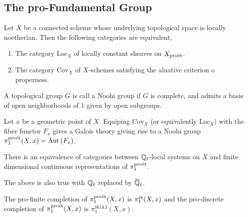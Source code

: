 \documentclass[12pt]{article}
\begin{document}
\subsection{The pro-\etale Fundamental Group}

\newcommand{\Loc}{\mathrm{Loc}}
\newcommand{\Cov}{\mathrm{Cov}}

\begin{theorem}
Let $X$ be a connected scheme whose underlying topological space is locally noetherian. Then the following categories are equivalent,
\begin{enumerate}
\item The category $\Loc_X$ of locally constant sheaves on $X_{\text{pro\'{e}t}}$.
\item The category $\Cov_X$ of \etale $X$-schemes satisfying the aluative criterion o properness. 
\end{enumerate}
\end{theorem}

\begin{defn}
A topological group $G$ is call a Noohi group if $G$ is complete, and admits a basis of open neighborhoods of $1$ given by open subgroups.
\end{defn}

\begin{defn}
Let $x$ be a geometric point of $X$. Equiping $\Cov_X$ (or equivalently $\Loc_X$) with the fiber functor $F_x$ gives a Galois theory giving rise to a Noohi group $\pi_1^{\text{pro\'{e}t}}(X, x) = \mathrm{Aut} \left( F_x \right)$.
\end{defn}

\begin{prop}
There is an equivalence of categories between $\mathbb{Q}_\ell$-local systems on $X$ and finite dimensional continuous representations of $\pi_1^{\text{pro\'{e}t}}$.
\end{prop}

\begin{rmk}
The above is also true with $\mathbb{Q}_\ell$ replaced by $\overline{\mathbb{Q}}_\ell$.
\end{rmk}

\begin{prop}
The pro-finite completion of $\pi_1^{\text{pro\'{e}t}}(X, x)$ is $\pi_1^{\text{\'{e}t}}(X, x)$ and the pro-discrete completion of $\pi_1^{\text{pro\'{e}t}}(X, x)$ is $\pi_1^{\text{SGA3}}(X, x)$. 
\end{prop}
\end{document}
